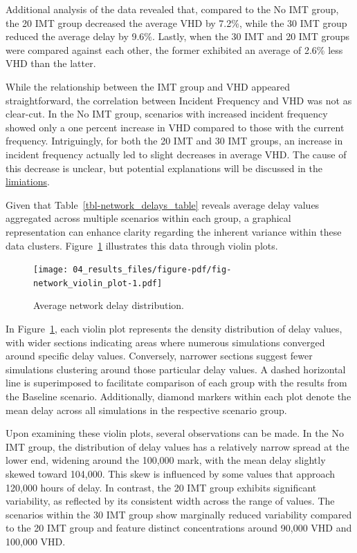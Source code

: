 \documentclass[fancy, oneside, mastersfancy, ms]{byuthesis}
\begin{document}
Additional analysis of the data revealed that, compared to the No IMT
group, the 20 IMT group decreased the average VHD by 7.2\%, while the 30
IMT group reduced the average delay by 9.6\%. Lastly, when the 30 IMT
and 20 IMT groups were compared against each other, the former exhibited
an average of 2.6\% less VHD than the latter.

While the relationship between the IMT group and VHD appeared
straightforward, the correlation between Incident Frequency and VHD was
not as clear-cut. In the No IMT group, scenarios with increased incident
frequency showed only a one percent increase in VHD compared to those
with the current frequency. Intriguingly, for both the 20 IMT and 30 IMT
groups, an increase in incident frequency actually led to slight
decreases in average VHD. The cause of this decrease is unclear, but
potential explanations will be discussed in the
\protect\hyperlink{sec-limitations}{limiations}.

Given that Table~\ref{tbl-network_delays_table} reveals average delay
values aggregated across multiple scenarios within each group, a
graphical representation can enhance clarity regarding the inherent
variance within these data clusters.
Figure~\ref{fig-network_violin_plot} illustrates this data through
violin plots.

\begin{figure}

{\centering \texttt{[image: 04\_results\_files/figure-pdf/fig-network\_violin\_plot-1.pdf]}

}

\caption{\label{fig-network_violin_plot}Average network delay
distribution.}

\end{figure}

In Figure~\ref{fig-network_violin_plot}, each violin plot represents the
density distribution of delay values, with wider sections indicating
areas where numerous simulations converged around specific delay values.
Conversely, narrower sections suggest fewer simulations clustering
around those particular delay values. A dashed horizontal line is
superimposed to facilitate comparison of each group with the results
from the Baseline scenario. Additionally, diamond markers within each
plot denote the mean delay across all simulations in the respective
scenario group.

Upon examining these violin plots, several observations can be made. In
the No IMT group, the distribution of delay values has a relatively
narrow spread at the lower end, widening around the 100,000 mark, with
the mean delay slightly skewed toward 104,000. This skew is influenced
by some values that approach 120,000 hours of delay. In contrast, the 20
IMT group exhibits significant variability, as reflected by its
consistent width across the range of values. The scenarios within the 30
IMT group show marginally reduced variability compared to the 20 IMT
group and feature distinct concentrations around 90,000 VHD and 100,000
VHD.
\end{document}
